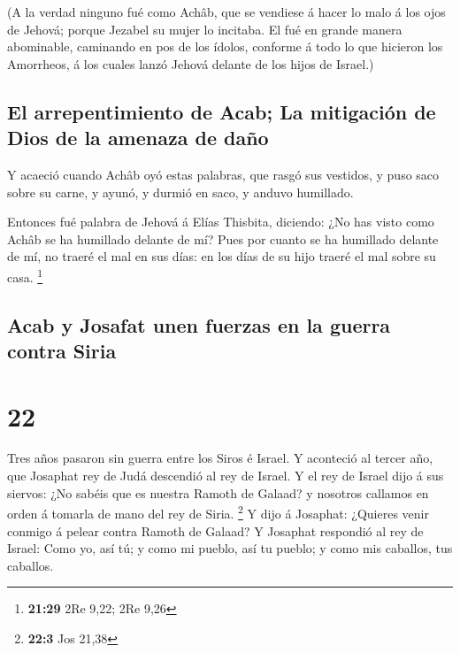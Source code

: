  (A la verdad ninguno fué como Achâb, que se vendiese á
hacer lo malo á los ojos de Jehová; porque Jezabel su mujer lo incitaba.
 El fué en grande manera abominable, caminando en pos de
los ídolos, conforme á todo lo que hicieron los Amorrheos, á los cuales
lanzó Jehová delante de los hijos de Israel.)

\hypertarget{el-arrepentimiento-de-acab-la-mitigaciuxf3n-de-dios-de-la-amenaza-de-dauxf1o}{%
\subsection{El arrepentimiento de Acab; La mitigación de Dios de la
amenaza de
daño}\label{el-arrepentimiento-de-acab-la-mitigaciuxf3n-de-dios-de-la-amenaza-de-dauxf1o}}

 Y acaeció cuando Achâb oyó estas palabras, que rasgó sus
vestidos, y puso saco sobre su carne, y ayunó, y durmió en saco, y
anduvo humillado.

 Entonces fué palabra de Jehová á Elías Thisbita, diciendo:
 ¿No has visto como Achâb se ha humillado delante de mí?
Pues por cuanto se ha humillado delante de mí, no traeré el mal en sus
días: en los días de su hijo traeré el mal sobre su casa. \footnote{\textbf{21:29}
  2Re 9,22; 2Re 9,26}

\hypertarget{acab-y-josafat-unen-fuerzas-en-la-guerra-contra-siria}{%
\subsection{Acab y Josafat unen fuerzas en la guerra contra
Siria}\label{acab-y-josafat-unen-fuerzas-en-la-guerra-contra-siria}}

\hypertarget{section-21}{%
\section{22}\label{section-21}}

 Tres años pasaron sin guerra entre los Siros é Israel.
 Y aconteció al tercer año, que Josaphat rey de Judá
descendió al rey de Israel.  Y el rey de Israel dijo á sus
siervos: ¿No sabéis que es nuestra Ramoth de Galaad? y nosotros callamos
en orden á tomarla de mano del rey de Siria. \footnote{\textbf{22:3} Jos
  21,38}  Y dijo á Josaphat: ¿Quieres venir conmigo á pelear
contra Ramoth de Galaad? Y Josaphat respondió al rey de Israel: Como yo,
así tú; y como mi pueblo, así tu pueblo; y como mis caballos, tus
caballos.

